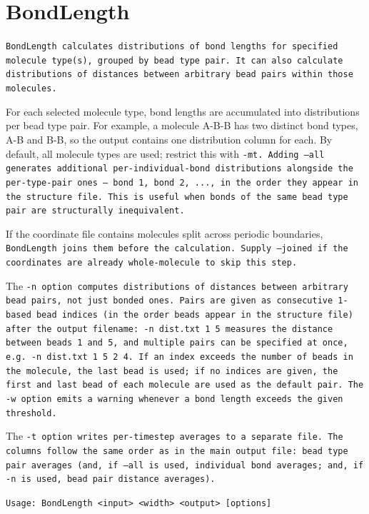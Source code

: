 \section{BondLength} \label{sec:BondLength}

\tt{BondLength} calculates distributions of bond lengths for specified molecule
type(s), grouped by bead type pair. It can also calculate distributions of
distances between arbitrary bead pairs within those molecules.

For each selected molecule type, bond lengths are accumulated into distributions
per bead type pair. For example, a molecule A-B-B has two distinct bond types,
A-B and B-B, so the output contains one distribution column for each. By default,
all molecule types are used; restrict this with \tt{-mt}. Adding \tt{--all}
generates additional per-individual-bond distributions alongside the per-type-pair
ones --- bond 1, bond 2, ..., in the order they appear in the structure file.
This is useful when bonds of the same bead type pair are structurally
inequivalent.

If the coordinate file contains molecules split across periodic boundaries,
\tt{BondLength} joins them before the calculation. Supply \tt{--joined} if the
coordinates are already whole-molecule to skip this step.

The \tt{-n} option computes distributions of distances between arbitrary bead
pairs, not just bonded ones. Pairs are given as consecutive 1-based bead indices
(in the order beads appear in the structure file) after the output filename:
\tt{-n dist.txt 1 5} measures the distance between beads 1 and~5, and multiple
pairs can be specified at once, e.g.\ \tt{-n dist.txt 1 5 2 4}. If an index
exceeds the number of beads in the molecule, the last bead is used; if no indices
are given, the first and last bead of each molecule are used as the default pair.
The \tt{-w} option emits a warning whenever a bond length exceeds the given
threshold.

The \tt{-t} option writes per-timestep averages to a separate file. The columns
follow the same order as in the main output file: bead type pair averages (and,
if \tt{--all} is used, individual bond averages; and, if \tt{-n} is used, bead
pair distance averages).

\noindent
\tt{Usage: BondLength <input> <width> <output> [options]}


